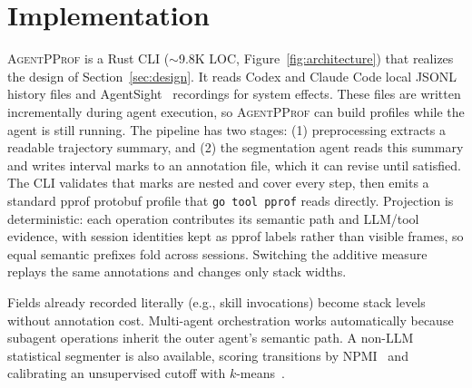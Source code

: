 \documentclass[sigconf,nonacm]{acmart}
\newcommand{\sys}{\textsc{AgentPProf}\xspace}
\begin{document}
\section{Implementation}
\label{sec:impl}

\sys is a Rust CLI ({$\sim$}9.8K LOC, Figure~\ref{fig:architecture}) that realizes the design of Section~\ref{sec:design}.
It reads Codex and Claude Code local JSONL history files and AgentSight~\cite{agentsight} recordings for system effects. These files are written incrementally during agent execution, so \sys can build profiles while the agent is still running.
The pipeline has two stages: (1) preprocessing extracts a readable trajectory summary, and (2) the segmentation agent reads this summary and writes interval marks to an annotation file, which it can revise until satisfied.
The CLI validates that marks are nested and cover every step, then emits a standard pprof protobuf profile that \texttt{go tool pprof} reads directly.
Projection is deterministic: each operation contributes its semantic path and LLM/tool evidence, with session identities kept as pprof labels rather than visible frames, so equal semantic prefixes fold across sessions.
Switching the additive measure replays the same annotations and changes only stack widths.

Fields already recorded literally (e.g., skill invocations) become stack levels without annotation cost.
Multi-agent orchestration works automatically because subagent operations inherit the outer agent's semantic path.
A non-LLM statistical segmenter is also available, scoring transitions by NPMI~\cite{bouma2009npmi} and calibrating an unsupervised cutoff with $k$-means~\cite{macqueen1967}.
\end{document}
